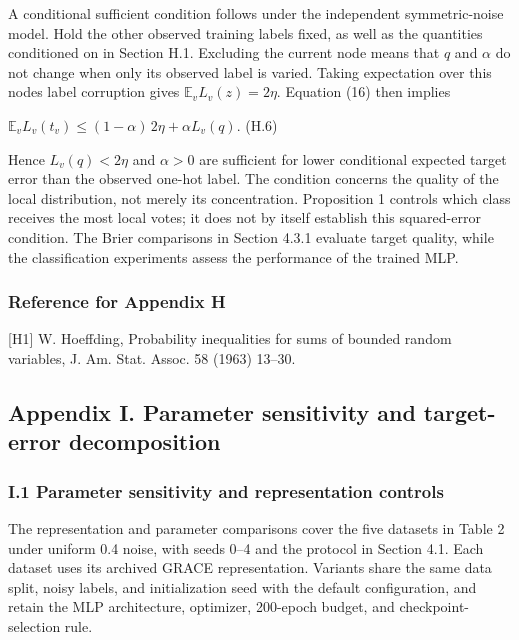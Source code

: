 A conditional sufficient condition follows under the independent symmetric-noise model. Hold the other observed training labels fixed, as well as the quantities conditioned on in Section H.1. Excluding the current node means that \(q\) and \(\alpha\) do not change when only its observed label is varied. Taking expectation over this node\textquotesingle s label corruption gives \(\mathbb{E}_{v}L_{v}(z) = 2\eta\). Equation (16) then implies

\(\mathbb{E}_{v}L_{v}(t_{v}) \leq (1 - \alpha)\, 2\eta + \alpha L_{v}(q).\) (H.6)

Hence \(L_{v}(q) < 2\eta\) and \(\alpha > 0\) are sufficient for lower conditional expected target error than the observed one-hot label. The condition concerns the quality of the local distribution, not merely its concentration. Proposition 1 controls which class receives the most local votes; it does not by itself establish this squared-error condition. The Brier comparisons in Section 4.3.1 evaluate target quality, while the classification experiments assess the performance of the trained MLP.

\subsubsection{Reference for Appendix H}\label{reference-for-appendix-h}

{[}H1{]} W. Hoeffding, Probability inequalities for sums of bounded random variables, J. Am. Stat. Assoc. 58 (1963) 13--30.

\subsection{Appendix I. Parameter sensitivity and target-error decomposition}\label{appendix-i.-parameter-sensitivity-and-target-error-decomposition}

\subsubsection{I.1 Parameter sensitivity and representation controls}\label{i.1-parameter-sensitivity-and-representation-controls}

The representation and parameter comparisons cover the five datasets in Table 2 under uniform 0.4 noise, with seeds 0--4 and the protocol in Section 4.1. Each dataset uses its archived GRACE representation. Variants share the same data split, noisy labels, and initialization seed with the default configuration, and retain the MLP architecture, optimizer, 200-epoch budget, and checkpoint-selection rule.

